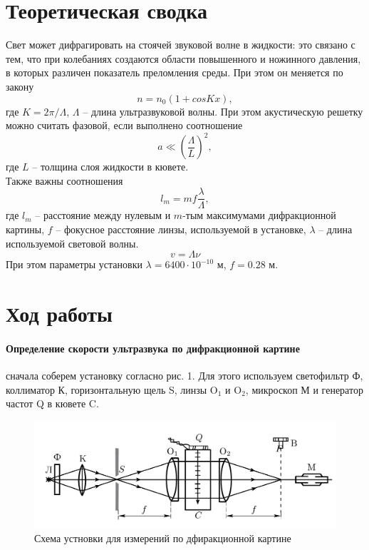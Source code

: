 \documentclass[a4paper,12pt]{article}
\begin{document}
\section*{Теоретическая сводка}
Свет может дифрагировать на стоячей звуковой волне в жидкости: это связано с тем, что при колебаниях создаются области повышенного и ножинного давления, в которых различен показатель преломления среды. При этом он меняется по закону
\begin{equation}
    n = n_0(1 + cos Kx),
\end{equation}
где $K = 2\pi/\Lambda$, $\Lambda$ -- длина ультразвуковой волны. При этом акустическую решетку можно считать фазовой, если выполнено соотношение 
\begin{equation}
    a \ll \left( \frac{\Lambda}{L} \right)^2,
\end{equation}
где $L$ -- толщина слоя жидкости в кювете. \\
\noindent
Также важны соотношения
\begin{equation}
    l_m = mf\frac{\lambda}{\Lambda},
\end{equation}
где $l_m$ -- расстояние между нулевым и $m$-тым максимумами дифракционной картины, $f$ -- фокусное расстояние линзы, используемой в установке, $\lambda$ -- длина используемой световой волны.
\begin{equation}
    v = \Lambda \nu
\end{equation}
При этом параметры установки $\lambda = 6400 \cdot 10^{-10}$ м, $f = 0.28$ м.

\newpage
\section*{Ход работы}
\paragraph{Определение скорости ультразвука по дифракционной картине} сначала соберем установку согласно рис. 1. Для этого используем светофильтр Ф, коллиматор К, горизонтальную щель S, линзы O$_1$ и O$_2$, микроскоп М и генератор частот Q в кювете C.

\begin{figure}[H]
    \centering
    \includegraphics[scale=0.3]{schema_1.png}
    \caption{Схема устновки для измерений по дфиракционной картине}
\end{figure}
\end{document}
